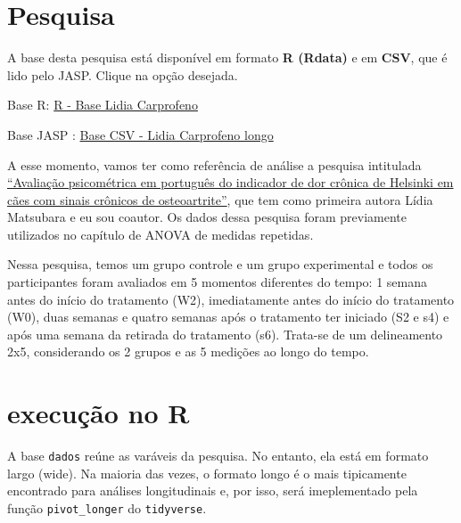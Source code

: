 \documentclass[
]{book}
\begin{document}
\hypertarget{pesquisa-7}{%
\section{Pesquisa}\label{pesquisa-7}}

A base desta pesquisa está disponível em formato \textbf{R (Rdata)} e em \textbf{CSV}, que é lido pelo JASP. Clique na opção desejada.

Base R: \href{https://github.com/anovabr/mqt/raw/master/bases/R\%20-\%20Base\%20Lidia\%20Carprofeno.RData}{R - Base Lidia Carprofeno}

Base JASP : \href{https://github.com/anovabr/mqt/raw/master/bases/bases_csv_jasp.zip}{Base CSV - Lidia Carprofeno longo}

A esse momento, vamos ter como referência de análise a pesquisa intitulada \href{https://www.scielo.br/scielo.php?script=sci_arttext\&pid=S0102-09352019000100109}{``Avaliação psicométrica em português do indicador de dor crônica de Helsinki em cães com sinais crônicos de osteoartrite''}, que tem como primeira autora Lídia Matsubara e eu sou coautor. Os dados dessa pesquisa foram previamente utilizados no capítulo de ANOVA de medidas repetidas.

Nessa pesquisa, temos um grupo controle e um grupo experimental e todos os participantes foram avaliados em 5 momentos diferentes do tempo: 1 semana antes do início do tratamento (W2), imediatamente antes do início do tratamento (W0), duas semanas e quatro semanas após o tratamento ter iniciado (S2 e s4) e após uma semana da retirada do tratamento (s6). Trata-se de um delineamento 2x5, considerando os 2 grupos e as 5 medições ao longo do tempo.

\hypertarget{execuuxe7uxe3o-no-r-12}{%
\section{execução no R}\label{execuuxe7uxe3o-no-r-12}}

A base \texttt{dados} reúne as varáveis da pesquisa. No entanto, ela está em formato largo (wide). Na maioria das vezes, o formato longo é o mais tipicamente encontrado para análises longitudinais e, por isso, será imeplementado pela função \texttt{pivot\_longer} do \texttt{tidyverse}.
\end{document}

